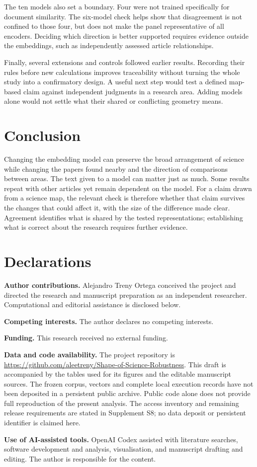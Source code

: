 \documentclass[12pt]{article}
\begin{document}
The ten models also set a boundary. Four were not trained specifically for document similarity. The six-model check helps show that disagreement is not confined to those four, but does not make the panel representative of all encoders. Deciding which direction is better supported requires evidence outside the embeddings, such as independently assessed article relationships.

Finally, several extensions and controls followed earlier results. Recording their rules before new calculations improves traceability without turning the whole study into a confirmatory design. A useful next step would test a defined map-based claim against independent judgments in a research area. Adding models alone would not settle what their shared or conflicting geometry means.

\section{Conclusion}
Changing the embedding model can preserve the broad arrangement of science while changing the papers found nearby and the direction of comparisons between areas. The text given to a model can matter just as much. Some results repeat with other articles yet remain dependent on the model. For a claim drawn from a science map, the relevant check is therefore whether that claim survives the changes that could affect it, with the size of the difference made clear. Agreement identifies what is shared by the tested representations; establishing what is correct about the research requires further evidence.

\section*{Declarations}
\textbf{Author contributions.}
Alejandro Treny Ortega conceived the project and directed the research and manuscript preparation as an independent researcher. Computational and editorial assistance is disclosed below.
\par\medskip
\textbf{Competing interests.}
The author declares no competing interests.
\par\medskip
\textbf{Funding.}
This research received no external funding.
\par\medskip
\textbf{Data and code availability.}
The project repository is \url{https://github.com/aleetreny/Shape-of-Science-Robustness}. This draft is accompanied by the tables used for its figures and the editable manuscript sources. The frozen corpus, vectors and complete local execution records have not been deposited in a persistent public archive. Public code alone does not provide full reproduction of the present analysis. The access inventory and remaining release requirements are stated in Supplement S8; no data deposit or persistent identifier is claimed here.
\par\medskip
\textbf{Use of AI-assisted tools.}
OpenAI Codex assisted with literature searches, software development and analysis, visualisation, and manuscript drafting and editing. The author is responsible for the content.



\end{document}

